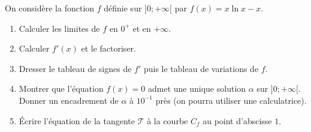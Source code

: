 \documentclass[11pt]{article}
\begin{document}
\begin{exercice}[Étude guidée d'une fonction : $f(x) = x\ln x - x$]
On considère la fonction $f$ définie sur $]0; +\infty[$ par $f(x) = x\ln x - x$.
\begin{enumerate}
    \item Calculer les limites de $f$ en $0^+$ et en $+\infty$.
    \item Calculer $f'(x)$ et le factoriser.
    \item Dresser le tableau de signes de $f'$ puis le tableau de variations de $f$.
    \item Montrer que l'équation $f(x) = 0$ admet une unique solution $\alpha$ sur $]0; +\infty[$.
    Donner un encadrement de $\alpha$ à $10^{-1}$ près (on pourra utiliser une calculatrice).
    \item Écrire l'équation de la tangente $\mathcal{T}$ à la courbe $C_f$ au point d'abscisse $1$.
\end{enumerate}
\end{exercice}
\end{document}
